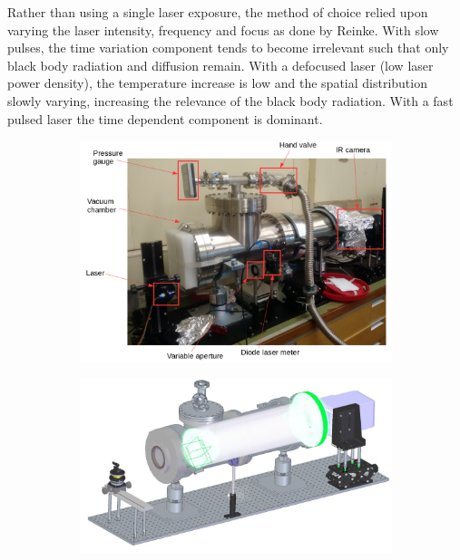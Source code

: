 Rather than using a single laser exposure, the method of choice relied upon varying the laser intensity, frequency and focus as done by Reinke.\cite{Reinke2018a} With slow pulses, the time variation component tends to become irrelevant such that only black body radiation and diffusion remain. With a defocused laser (low laser power density), the temperature increase is low and the spatial distribution slowly varying, increasing the relevance of the black body radiation. With a fast pulsed laser the time dependent component is dominant.


\begin{figure}[!ht]
     \centering
     \begin{subfigure}{0.8\linewidth}
        \centering
        \includegraphics[width=\textwidth,trim={20 0 20 0},clip]{Chapters/chapter2/figs/vacuum_setup_3.png}
        \vspace*{-5mm}
        {\color{white}\caption{\phantom{ }}\label{fig:vacuum_setup1}}
     \end{subfigure}
     \begin{subfigure}{0.8\linewidth}
        \centering
        \includegraphics[width=\textwidth,trim={0 0 0 0},clip]{Chapters/chapter2/figs/vacuum_setup2.png}

\end{subfigure}
\end{figure}
